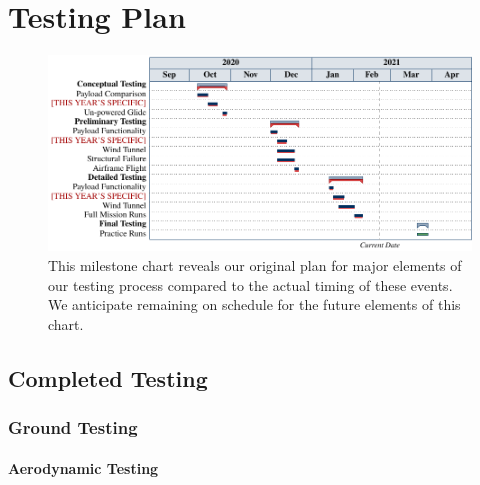 \documentclass[report]{byu-aero}
\begin{document}
\section{Testing Plan} %
\label{sec:TestingPlan}


\begin{figure}[h!]
	\centering
	\includegraphics[]{testingchart.pdf}
	\caption{This milestone chart reveals our {\color{\BYUblue}original plan} for major elements of our testing process compared to the {\color{\BYUred}actual timing} of these events. We anticipate remaining on schedule for the {\color{\BYUgreen} future elements} of this chart.}
	\label{fig:plannedvsactualtimingtesting}
\end{figure}



\subsection{Completed Testing}
\label{ssec:completedtesting}

\lipsum[1-2]


\subsubsection{Ground Testing}
\label{sssec:groundtesting}

\paragraph{Aerodynamic Testing}
\end{document}
